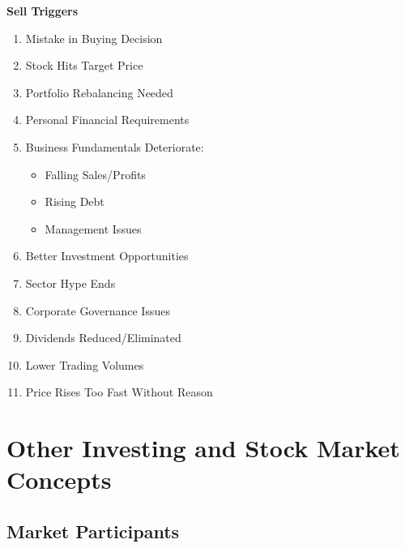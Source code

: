 \documentclass[12pt]{article}
\begin{document}
\textbf{Sell Triggers}
\begin{enumerate}
\item Mistake in Buying Decision
\item Stock Hits Target Price
\item Portfolio Rebalancing Needed
\item Personal Financial Requirements
\item Business Fundamentals Deteriorate:
    \begin{itemize}
    \item Falling Sales/Profits
    \item Rising Debt
    \item Management Issues
    \end{itemize}
    
\item Better Investment Opportunities
\item Sector Hype Ends
\item Corporate Governance Issues
\item Dividends Reduced/Eliminated
\item Lower Trading Volumes
\item Price Rises Too Fast Without Reason
\end{enumerate}

\section{Other Investing and Stock Market Concepts}

\subsection{Market Participants}
\end{document}

